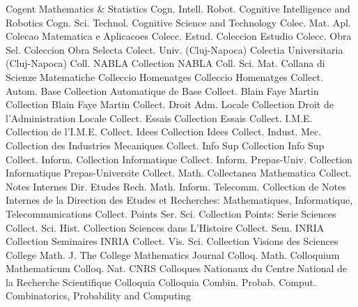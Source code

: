{Cogent Mathematics & Statistics}
{Cogn. Intell. Robot.}
{Cognitive Intelligence and Robotics}
{Cogn. Sci. Technol.}
{Cognitive Science and Technology}
{Colec. Mat. Apl.}
{Colecao Matematica e Aplicacoes}
{Colecc. Estud.}
{Coleccion Estudio}
{Colecc. Obra Sel.}
{Coleccion Obra Selecta}
{Colect. Univ. (Cluj-Napoca)}
{Colectia Universitaria (Cluj-Napoca)}
{Coll. NABLA}
{Collection NABLA}
{Coll. Sci. Mat.}
{Collana di Scienze Matematiche}
{Colleccio Homenatges}
{Colleccio Homenatges}
{Collect. Autom. Base}
{Collection Automatique de Base}
{Collect. Blain Faye Martin}
{Collection Blain Faye Martin}
{Collect. Droit Adm. Locale}
{Collection Droit de l'Administration Locale}
{Collect. Essais}
{Collection Essais}
{Collect. I.M.E.}
{Collection de l'I.M.E.}
{Collect. Idees}
{Collection Idees}
{Collect. Indust. Mec.}
{Collection des Industries Mecaniques}
{Collect. Info Sup}
{Collection Info Sup}
{Collect. Inform.}
{Collection Informatique}
{Collect. Inform. Prepas-Univ.}
{Collection Informatique Prepas-Universite}
{Collect. Math.}
{Collectanea Mathematica}
{Collect. Notes Internes Dir. Etudes Rech. Math. Inform. Telecomm.}
{Collection de Notes Internes de la Direction des Etudes et Recherches: Mathematiques, Informatique, Telecommunications}
{Collect. Points Ser. Sci.}
{Collection Points: Serie Sciences}
{Collect. Sci. Hist.}
{Collection Sciences dans L'Histoire}
{Collect. Sem. INRIA}
{Collection Seminaires INRIA}
{Collect. Vis. Sci.}
{Collection Visions des Sciences}
{College Math. J.}
{The College Mathematics Journal}
{Colloq. Math.}
{Colloquium Mathematicum}
{Colloq. Nat. CNRS}
{Colloques Nationaux du Centre National de la Recherche Scientifique}
{Colloquia}
{Colloquia}
{Combin. Probab. Comput.}
{Combinatorics, Probability and Computing}
